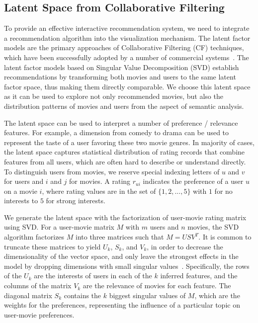 \documentclass{vgtc}                          %
\begin{document}
\subsection{Latent Space from Collaborative Filtering}

To provide an effective interactive recommendation system, we need to integrate a recommendation algorithm into the visualization mechanism.
The latent factor models are the primary approaches of Collaborative Filtering (CF) techniques, which have been successfully adopted by a number of commercial systems~\cite{Koren:2008:FMN:1401890.1401944}.
The latent factor models based on Singular Value Decomposition (SVD) establish recommendations by transforming both movies and users to the same latent factor space, thus making them directly comparable. 
We choose this latent space as it can be used to explore not only recommended movies, but also the distribution patterns of movies and users from the aspect of semantic analysis.

The latent space can be used to interpret a number of preference / relevance features. 
For example, a dimension from comedy to drama can be used to represent the taste of a user favoring these two movie genres.  
In majority of cases, the latent space captures statistical distribution of rating records that combine features from all users, which are often hard to describe or understand directly.
To distinguish users from movies, we reserve special indexing letters of $u$ and $v$ for users and $i$ and $j$ for movies. 
A rating $r_{ui}$ indicates the preference of a user $u$ on a movie $i$, where rating values are in the set of $\{1, 2, ..., 5\}$ with $1$ for no interests to $5$ for strong interests. 

We generate the latent space with the factorization of user-movie rating matrix using SVD. 
For a user-movie matrix $M$ with $m$ users and $n$ movies, the SVD algorithm factorizes $M$ into three matrices such that $M = USV^T$.
It is common to truncate these matrices to yield $U_k$, $S_k$, and $V_k$, in order to decrease the dimensionality of the vector space, and only leave the strongest effects in the model by dropping dimensions with small singular values~\cite{Ekstrand:2011:CFR:2185827.2185828}.
Specifically, the rows of the $U_k$ are the interests of users in each of the $k$ inferred features, and the columns of the matrix $V_k$ are the relevance of movies for each feature. 
The diagonal matrix $S_k$ contains the $k$ biggest singular values of $M$, which are the weights for the preferences, representing the influence of a particular topic on user-movie preferences. 
\end{document}

